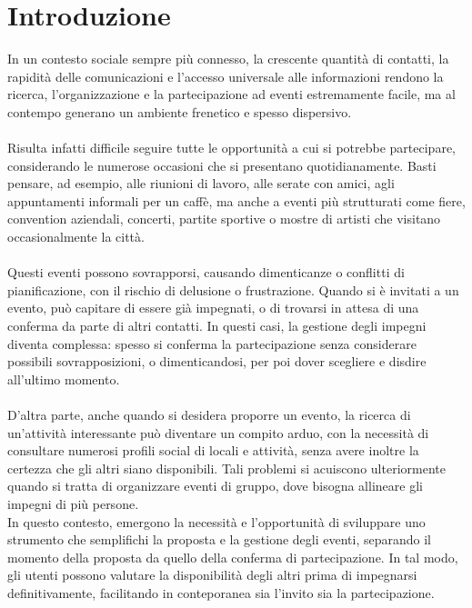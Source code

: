 \chapter*{Introduzione}


In un contesto sociale sempre più connesso, la crescente quantità di contatti, 
la rapidità delle comunicazioni e l'accesso universale alle informazioni 
rendono la ricerca, l'organizzazione e la partecipazione ad eventi estremamente facile, 
ma al contempo generano un ambiente frenetico e spesso dispersivo.\\
\\
Risulta infatti difficile seguire tutte le opportunità a cui si potrebbe partecipare, 
considerando le numerose occasioni che si presentano quotidianamente. 
Basti pensare, ad esempio, alle riunioni di lavoro, alle serate con amici, agli appuntamenti informali per un caffè, 
ma anche a eventi più strutturati come fiere, convention aziendali, concerti, partite sportive o mostre di artisti che visitano occasionalmente la città.\\
\\
Questi eventi possono sovrapporsi, causando dimenticanze o conflitti di pianificazione, 
con il rischio di delusione o frustrazione. 
Quando si è invitati a un evento, può capitare di essere già impegnati, 
o di trovarsi in attesa di una conferma da parte di altri contatti.
In questi casi, la gestione degli impegni diventa complessa: 
spesso si conferma la partecipazione senza considerare possibili sovrapposizioni, o dimenticandosi, 
per poi dover scegliere e disdire all'ultimo momento. \\
\\
D’altra parte, anche quando si desidera proporre un evento, 
la ricerca di un'attività interessante può diventare un compito arduo, 
con la necessità di consultare numerosi profili social di locali e attività,
senza avere inoltre la certezza che gli altri siano disponibili.
Tali problemi si acuiscono ulteriormente quando si tratta di organizzare eventi di gruppo, 
dove bisogna allineare gli impegni di più persone.\\
\clearpage
In questo contesto, emergono la necessità e l'opportunità di sviluppare uno strumento che semplifichi la proposta e la gestione degli eventi, 
separando il momento della proposta da quello della conferma di partecipazione. 
In tal modo, gli utenti possono valutare la disponibilità degli altri prima di impegnarsi definitivamente, 
facilitando in conteporanea sia l'invito sia la partecipazione.\\ 

